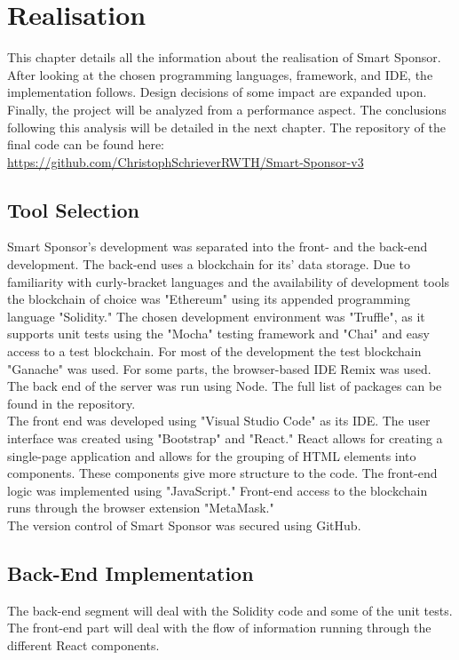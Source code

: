 \chapter{Realisation}
This chapter details all the information about the realisation of Smart Sponsor. After looking at the chosen programming languages, framework, and IDE, the implementation follows. Design decisions of some impact are expanded upon. Finally, the project will be analyzed from a performance aspect. The conclusions following this analysis will be detailed in the next chapter. The repository of the final code can be found here:
\url{https://github.com/ChristophSchrieverRWTH/Smart-Sponsor-v3}
\section{Tool Selection}
Smart Sponsor's development was separated into the front- and the back-end development. The back-end uses a blockchain for its' data storage. Due to familiarity with curly-bracket languages and the availability of development tools the blockchain of choice was "Ethereum" using its appended programming language "Solidity." The chosen development environment was "Truffle", as it supports unit tests using the "Mocha" testing framework and "Chai" and easy access to a test blockchain. For most of the development the test blockchain "Ganache" was used. For some parts, the browser-based IDE Remix\cite{remix} was used. The back end of the server was run using Node. The full list of packages can be found in the repository.\\
The front end was developed using "Visual Studio Code" as its IDE. The user interface was created using "Bootstrap" and "React." React allows for creating a single-page application and allows for the grouping of HTML elements into components. These components give more structure to the code. The front-end logic was implemented using "JavaScript." Front-end access to the blockchain runs through the browser extension "MetaMask."\\
The version control of Smart Sponsor was secured using GitHub.
\section{Back-End Implementation}
The back-end segment will deal with the Solidity code and some of the unit tests. The front-end part will deal with the flow of information running through the different React components.
